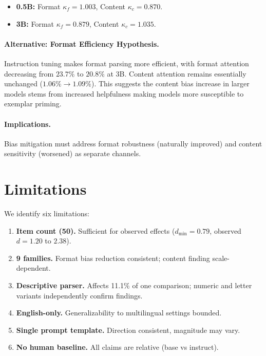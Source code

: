 \documentclass[11pt,a4paper]{article}
\begin{document}
\begin{itemize}
    \item \textbf{0.5B:} Format $\kappa_f = 1.003$, Content $\kappa_c = 0.870$.
    \item \textbf{3B:} Format $\kappa_f = 0.879$, Content $\kappa_c = 1.035$.
\end{itemize}

\paragraph{Alternative: Format Efficiency Hypothesis.} Instruction tuning makes format parsing more efficient, with format attention decreasing from $23.7\%$ to $20.8\%$ at 3B. Content attention remains essentially unchanged ($1.06\% \to 1.09\%$). This suggests the content bias increase in larger models stems from increased helpfulness making models more susceptible to exemplar priming.

\paragraph{Implications.} Bias mitigation must address format robustness (naturally improved) and content sensitivity (worsened) as separate channels.

\section{Limitations}

We identify six limitations:
\begin{enumerate}
    \item \textbf{Item count (50).} Sufficient for observed effects ($d_{\min}=0.79$, observed $d=1.20$ to $2.38$).
    \item \textbf{9 families.} Format bias reduction consistent; content finding scale-dependent.
    \item \textbf{Descriptive parser.} Affects 11.1\% of one comparison; numeric and letter variants independently confirm findings.
    \item \textbf{English-only.} Generalizability to multilingual settings bounded.
    \item \textbf{Single prompt template.} Direction consistent, magnitude may vary.
    \item \textbf{No human baseline.} All claims are relative (base vs instruct).
\end{enumerate}

\end{document}
